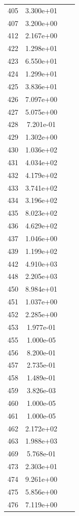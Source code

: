 \documentclass[12pt]{article}
\begin{document}
\begin{longtable}{@{}cccc@{}}
405 & 3.300e+01 &  &  \\
407 & 3.200e+00 &  &  \\
412 & 2.167e+00 &  &  \\
422 & 1.298e+01 &  &  \\
423 & 6.550e+01 &  &  \\
424 & 1.299e+01 &  &  \\
425 & 3.836e+01 &  &  \\
426 & 7.097e+00 &  &  \\
427 & 5.075e+00 &  &  \\
428 & 7.201e-01 &  &  \\
429 & 1.302e+00 &  &  \\
430 & 1.036e+02 &  &  \\
431 & 4.034e+02 &  &  \\
432 & 4.179e+02 &  &  \\
433 & 3.741e+02 &  &  \\
434 & 3.196e+02 &  &  \\
435 & 8.023e+02 &  &  \\
436 & 4.629e+02 &  &  \\
437 & 1.046e+00 &  &  \\
439 & 1.199e+02 &  &  \\
442 & 4.910e+03 &  &  \\
448 & 2.205e+03 &  &  \\
450 & 8.984e+01 &  &  \\
451 & 1.037e+00 &  &  \\
452 & 2.285e+00 &  &  \\
453 & 1.977e-01 &  &  \\
455 & 1.000e-05 &  &  \\
456 & 8.200e-01 &  &  \\
457 & 2.735e-01 &  &  \\
458 & 1.489e-01 &  &  \\
459 & 3.826e-03 &  &  \\
460 & 1.000e-05 &  &  \\
461 & 1.000e-05 &  &  \\
462 & 2.172e+02 &  &  \\
463 & 1.988e+03 &  &  \\
469 & 5.768e-01 &  &  \\
473 & 2.303e+01 &  &  \\
474 & 9.261e+00 &  &  \\
475 & 5.856e+00 &  &  \\
476 & 7.119e+00 &  &  \\

\end{longtable}
\end{document}
